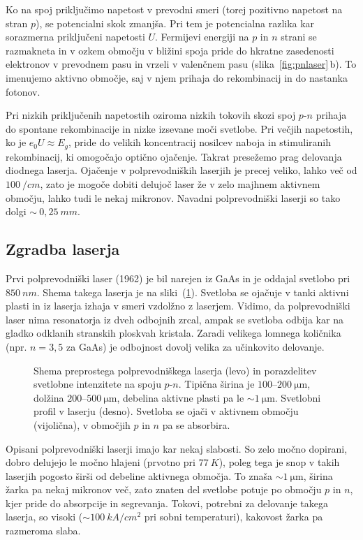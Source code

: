 Ko na spoj priključimo napetost v prevodni smeri (torej pozitivno napetost na stran
$p$), se potencialni skok zmanjša. Pri tem je potencialna razlika kar sorazmerna priključeni
napetosti $U$. Fermijevi energiji na $p$ in $n$ strani se razmakneta in v
ozkem območju v bližini spoja pride do hkratne zasedenosti elektronov
v prevodnem pasu in vrzeli v valenčnem pasu (slika~\ref{fig:pnlaser}\,b). 
To imenujemo aktivno območje, saj v njem prihaja do rekombinacij in do nastanka fotonov. 

Pri nizkih 
priključenih napetostih oziroma nizkih tokovih skozi spoj $p$-$n$ prihaja
do spontane rekombinacije in nizke izsevane moči svetlobe. 
Pri večjih napetostih, ko je $e_0U \approx E_g$, pride do velikih koncentracij nosilcev naboja in
stimuliranih rekombinacij, ki omogočajo optično ojačenje. Takrat presežemo prag delovanja
diodnega laserja. 
Ojačenje v polprevodniških laserjih je precej veliko, lahko več od 
$100~/\si{cm}$, zato je mogoče dobiti delujoč laser že v zelo majhnem aktivnem 
območju, lahko tudi le nekaj mikronov. Navadni polprevodniški laserji so tako 
dolgi $\sim~0,25~\si{mm}$.

\subsection*{Zgradba laserja}
Prvi polprevodniški laser (1962) je bil narejen iz GaAs in je oddajal svetlobo 
pri $850~\si{nm}$. Shema takega laserja je na sliki~(\ref{fig:pnshema}). Svetloba se ojačuje
v tanki aktivni plasti in iz laserja izhaja v smeri vzdolžno z laserjem. 
Vidimo, da polprevodniški laser nima resonatorja iz dveh odbojnih zrcal,
ampak se svetloba odbija kar na gladko odklanih stranskih ploskvah kristala. Zaradi
velikega lomnega količnika (npr. $n=3,5$ za GaAs) je odbojnost dovolj velika
za učinkovito delovanje.
\begin{figure}[h]
\centering
\def\svgwidth{130truemm} 

\caption{Shema preprostega polprevodniškega laserja (levo) in porazdelitev svetlobne
intenzitete na spoju $p$-$n$. Tipična širina je $100$--$200~\si{\micro\metre}$, 
dolžina $200$--$500~\si{\micro\metre}$, debelina aktivne plasti pa le $\sim 1~\si{\micro\metre}$. 
Svetlobni profil v laserju (desno). Svetloba 
se ojači v aktivnem območju (vijolična), v območjih $p$ in $n$ pa se absorbira.
}
\label{fig:pnshema}
\end{figure}

Opisani polprevodniški laserji imajo kar nekaj slabosti. So zelo močno dopirani, 
dobro delujejo le močno hlajeni (prvotno pri $77~\si{K}$), poleg tega je snop 
v takih laserjih pogosto širši od debeline aktivnega območja. To znaša
$\sim 1~\si{\micro\meter}$, širina žarka pa nekaj mikronov več, zato
znaten del svetlobe potuje po območju $p$ in $n$, kjer pride do 
absorpcije in segrevanja. Tokovi, potrebni za 
delovanje takega laserja, so visoki ($\sim 100~\si{kA}/\si{cm}^2$ pri sobni temperaturi), 
kakovost žarka pa razmeroma slaba. 

